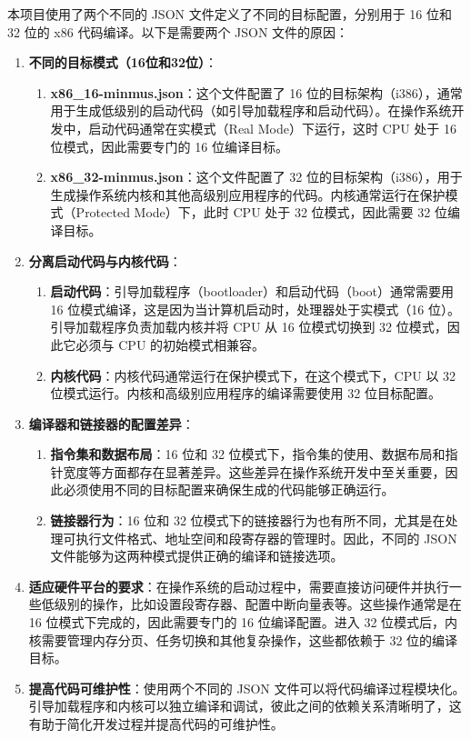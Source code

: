 本项目使用了两个不同的 JSON 文件定义了不同的目标配置，分别用于 16 位和 32 位的 x86 代码编译。以下是需要两个 JSON 文件的原因：

\begin{enumerate}
    \item \textbf{不同的目标模式（16位和32位）}：
          \begin{enumerate}
              \item \textbf{x86\_16-minmus.json}：这个文件配置了 16 位的目标架构（i386），通常用于生成低级别的启动代码（如引导加载程序和启动代码）。在操作系统开发中，启动代码通常在实模式（Real Mode）下运行，这时 CPU 处于 16 位模式，因此需要专门的 16 位编译目标。
              \item \textbf{x86\_32-minmus.json}：这个文件配置了 32 位的目标架构（i386），用于生成操作系统内核和其他高级别应用程序的代码。内核通常运行在保护模式（Protected Mode）下，此时 CPU 处于 32 位模式，因此需要 32 位编译目标。
          \end{enumerate}
    \item \textbf{分离启动代码与内核代码}：
          \begin{enumerate}
              \item \textbf{启动代码}：引导加载程序（bootloader）和启动代码（boot）通常需要用 16 位模式编译，这是因为当计算机启动时，处理器处于实模式（16 位）。引导加载程序负责加载内核并将 CPU 从 16 位模式切换到 32 位模式，因此它必须与 CPU 的初始模式相兼容。
              \item \textbf{内核代码}：内核代码通常运行在保护模式下，在这个模式下，CPU 以 32 位模式运行。内核和高级别应用程序的编译需要使用 32 位目标配置。
          \end{enumerate}
    \item \textbf{编译器和链接器的配置差异}：
          \begin{enumerate}
              \item \textbf{指令集和数据布局}：16 位和 32 位模式下，指令集的使用、数据布局和指针宽度等方面都存在显著差异。这些差异在操作系统开发中至关重要，因此必须使用不同的目标配置来确保生成的代码能够正确运行。
              \item \textbf{链接器行为}：16 位和 32 位模式下的链接器行为也有所不同，尤其是在处理可执行文件格式、地址空间和段寄存器的管理时。因此，不同的 JSON 文件能够为这两种模式提供正确的编译和链接选项。
          \end{enumerate}
    \item \textbf{适应硬件平台的要求}：在操作系统的启动过程中，需要直接访问硬件并执行一些低级别的操作，比如设置段寄存器、配置中断向量表等。这些操作通常是在 16 位模式下完成的，因此需要专门的 16 位编译配置。进入 32 位模式后，内核需要管理内存分页、任务切换和其他复杂操作，这些都依赖于 32 位的编译目标。
    \item \textbf{提高代码可维护性}：使用两个不同的 JSON 文件可以将代码编译过程模块化。引导加载程序和内核可以独立编译和调试，彼此之间的依赖关系清晰明了，这有助于简化开发过程并提高代码的可维护性。
\end{enumerate}

